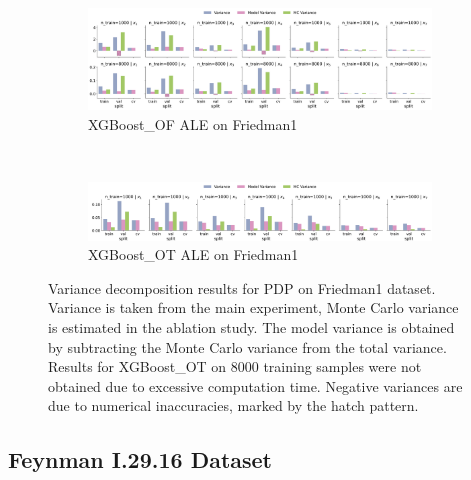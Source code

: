 \documentclass[runningheads]{llncs}
\begin{document}
\begin{figure}[htbp]
    \centering
    \begin{subfigure}[b]{\textwidth}
        \includegraphics[width=\textwidth]{img/Friedman1-all/variance_decomposition_ale_XGBoost_OF.png}
        \caption{XGBoost\_OF ALE on Friedman1}
    \end{subfigure}
    \\[10pt]
    \vfill
    \begin{subfigure}[b]{\textwidth}
        \includegraphics[width=\textwidth]{img/Friedman1-all/variance_decomposition_ale_XGBoost_OT.png}
        \caption{XGBoost\_OT ALE on Friedman1}
    \end{subfigure}
    \caption{Variance decomposition results for PDP on Friedman1 dataset. Variance is taken from the
    main experiment, Monte Carlo variance is estimated in the ablation study. The model variance is
    obtained by subtracting the Monte Carlo variance from the total variance. Results for XGBoost\_OT
    on 8000 training samples were not obtained due to excessive computation time. Negative variances are
    due to numerical inaccuracies, marked by the hatch pattern.}
    \label{fig:ale-variance-decomp-friedman1}  %
\end{figure}

\clearpage
\subsection{Feynman I.29.16 Dataset}
\end{document}
